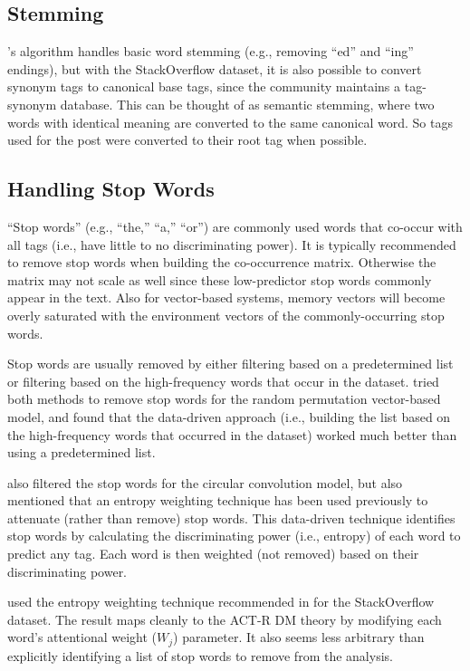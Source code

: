 \documentclass[man,floatsintext,donotrepeattitle]{apa6}
\begin{document}
\subsection{Stemming}

\textcite{Owoputi2013}'s algorithm handles basic word stemming (e.g., removing ``ed'' and ``ing'' endings), but
with the StackOverflow dataset, it is also possible to convert synonym tags to canonical base tags, since the community maintains a tag-synonym database.
This can be thought of as semantic stemming, where two words with identical meaning are converted to the same canonical word.
So tags used for the post were converted to their root tag when possible.

\subsection{Handling Stop Words}

``Stop words'' (e.g., ``the,'' ``a,'' ``or'') are commonly used words that co-occur with all tags (i.e., have little to no discriminating power).
It is typically recommended \parencite{Bird2009} to remove stop words when building the co-occurrence matrix.
Otherwise the matrix may not scale as well since these low-predictor stop words commonly appear in the text.
Also for vector-based systems, memory vectors will become overly saturated with the environment vectors of the commonly-occurring stop words.

Stop words are usually removed by either filtering based on a predetermined list or filtering based on the high-frequency words that occur in the dataset.
\textcite{Sahlgren2008} tried both methods to remove stop words for the random permutation vector-based model, and found that the data-driven approach
(i.e., building the list based on the high-frequency words that occurred in the dataset) worked much better than using a predetermined list.

\textcite{Jones2007} also filtered the stop words for the circular convolution model,
but also mentioned that an entropy weighting technique \parencite{Dumais1991} has been used previously to attenuate (rather than remove) stop words.
This data-driven technique identifies stop words by calculating the discriminating power (i.e., entropy) of each word to predict any tag.
Each word is then weighted (not removed) based on their discriminating power.

\textcite{Stanley2013} used the entropy weighting technique recommended in \textcite{Dumais1991} for the StackOverflow dataset.
The result maps cleanly to the ACT-R DM theory by modifying each word's attentional weight ($W_{j}$) parameter.
It also seems less arbitrary than explicitly identifying a list of stop words to remove from the analysis.
\end{document}
